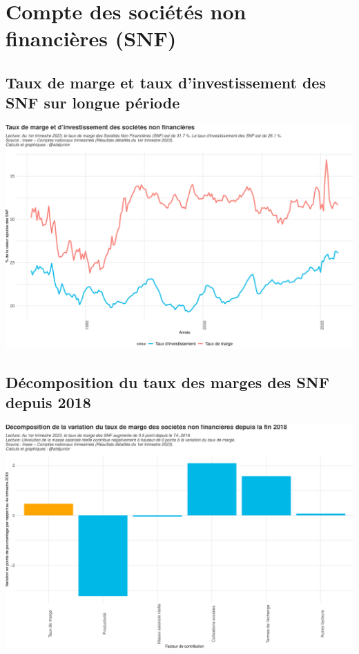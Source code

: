 \documentclass[
  paper=a4,
  ,captions=tableheading
]{scrartcl}
\begin{document}
\newpage

\hypertarget{compte-des-sociuxe9tuxe9s-non-financiuxe8res-snf}{%
\section{Compte des sociétés non financières
(SNF)}\label{compte-des-sociuxe9tuxe9s-non-financiuxe8res-snf}}

\hypertarget{taux-de-marge-et-taux-dinvestissement-des-snf-sur-longue-puxe9riode}{%
\subsection{Taux de marge et taux d'investissement des SNF sur longue
période}\label{taux-de-marge-et-taux-dinvestissement-des-snf-sur-longue-puxe9riode}}

\includegraphics{rapport_pdf_csi_files/figure-latex/unnamed-chunk-6-1.pdf}

\hypertarget{duxe9composition-du-taux-des-marges-des-snf-depuis-2018}{%
\subsection{Décomposition du taux des marges des SNF depuis
2018}\label{duxe9composition-du-taux-des-marges-des-snf-depuis-2018}}

\includegraphics{rapport_pdf_csi_files/figure-latex/unnamed-chunk-7-1.pdf}
\end{document}
